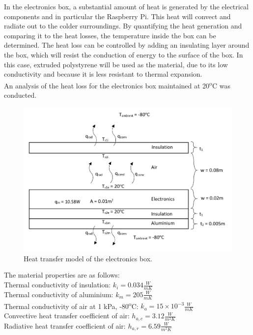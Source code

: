 In the electronics box, a substantial amount of heat is generated by the electrical components and in particular the Raspberry Pi. This heat will convect and radiate out to the colder surroundings. By quantifying the heat generation and comparing it to the heat losses, the temperature inside the box can be determined. The heat loss can be controlled by adding an insulating layer around the box, which will resist the conduction of energy to the surface of the box. In this case, extruded polystyrene will be used as the material, due to its low conductivity and because it is less resistant to thermal expansion. \\

An analysis of the heat loss for the electronics box maintained at 20\textsuperscript{o}C was conducted. \\

	\begin{figure}[h!]
    \centering
    \includegraphics[scale=0.6]{4-experiment-design/img/mechanical/thermaldiagram.JPG}
	\caption{Heat transfer model of the electronics box.}
	\label{fig:thermaldiagram}
	\end{figure}

The material properties are as follows: \\

Thermal conductivity of insulation: $ k_{i} = 0.034 \frac{W}{m K} $ \\
Thermal conductivity of aluminium: $ k_{m} = 205 \frac{W}{m K} $ \\
Thermal conductivity of air at 1 kPa, -80\textsuperscript{o}C: $ k_{a} = 15\times10^{-3} \frac{W}{m K} $ \\ 
Convective heat transfer coefficient of air: $ h_{a,c} = 3.12 \frac{W}{m^{2} K} $ \\ 
Radiative heat transfer coefficient of air: $ h_{a,r} = 6.59 \frac{W}{m^{2} K} $ \\ 

